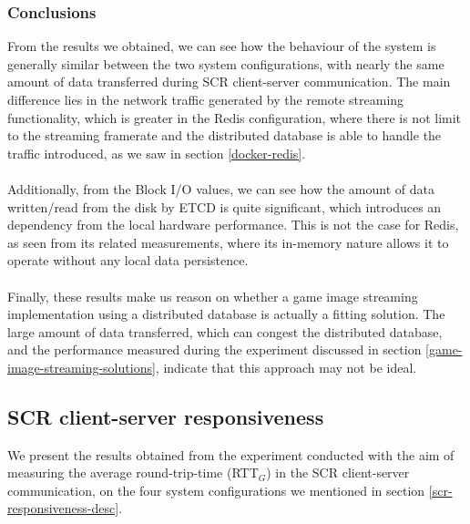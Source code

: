 \subsubsection{Conclusions}
From the results we obtained, we can see how the behaviour of the system is generally similar between the two system configurations, with nearly the same amount of data transferred during SCR client-server communication. The main difference lies in the network traffic generated by the remote streaming functionality, which is greater in the Redis configuration, where there is not limit to the streaming framerate and the distributed database is able to handle the traffic introduced, as we saw in section \ref{docker-redis}. \\ \\
Additionally, from the Block I/O values, we can see how the amount of data written/read from the disk by ETCD is quite significant, which introduces an dependency from the local hardware performance. This is not the case for Redis, as seen from its related measurements, where its in-memory nature allows it to operate without any local data persistence. \\ \\
Finally, these results make us reason on whether a game image streaming implementation using a distributed database is actually a fitting solution. The large amount of data transferred, which can congest the distributed database, and the performance measured during the experiment discussed in section \ref{game-image-streaming-solutions}, indicate that this approach may not be ideal.

\subsection{SCR client-server responsiveness}
We present the results obtained from the experiment conducted with the aim of measuring the average round-trip-time (RTT$_G$) in the SCR client-server communication, on the four system configurations we mentioned in section \ref{scr-responsiveness-desc}.


